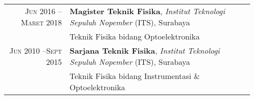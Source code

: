 %
%



\begin{tabular}{rl}
	\textsc{Jun 2016 -- Maret 2018} &  \textbf{Magister Teknik Fisika},  \emph{Institut Teknologi Sepuluh Nopember} (ITS), Surabaya\\
									&  Teknik Fisika bidang Optoelektronika \\
	\textsc{Jun 2010 --Sept 2015} 	&  \textbf{Sarjana Teknik Fisika},  \emph{Institut Teknologi Sepuluh Nopember} (ITS), Surabaya\\
									&  Teknik Fisika bidang Instrumentasi \& Optoelektronika \\
\end{tabular}